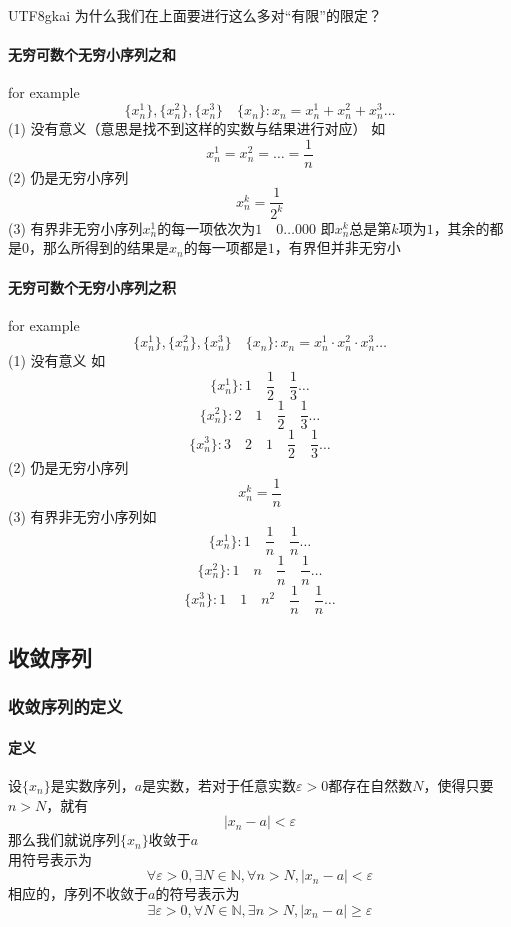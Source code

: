 \documentclass{article}
\begin{document}
\begin{CJK}{UTF8}{gkai}
为什么我们在上面要进行这么多对“有限”的限定？\\
\paragraph{无穷可数个无穷小序列之和}
for example\[\{x_n^1\},\{x_n^2\},\{x_n^3\}\quad \{x_n\}:x_n=x_n^1+x_n^2+x_n^3\dots\]
(1) 没有意义（意思是找不到这样的实数与结果进行对应） 如\[x_n^1=x_n^2=\dots=\frac{1}{n}\]
(2) 仍是无穷小序列\[x_n^k=\frac{1}{2^k}\]
(3) 有界非无穷小序列$x_n^1$的每一项依次为$1\quad 0 \dots 0 0 0$
即$x_n^k$总是第$k$项为$1$，其余的都是$0$，那么所得到的结果是$x_n$的每一项都是$1$，有界但并非无穷小

\paragraph{无穷可数个无穷小序列之积}
for example\[\{x_n^1\},\{x_n^2\},\{x_n^3\}\quad \{x_n\}:x_n=x_n^1·x_n^2·x_n^3\dots\]
(1) 没有意义 如\[\{x_n^1\}:1 \quad\frac{1}{2}\quad \frac{1}{3} \dots\]
\[\{x_n^2\}:2\quad1\quad \frac{1}{2}\quad \frac{1}{3}\dots \]
\[ \{x_n^3\}: 3 \quad2\quad 1\quad \frac{1}{2}\quad \frac{1}{3} \dots \]
(2) 仍是无穷小序列\[x_n^k=\frac{1}{n}\]
(3) 有界非无穷小序列如\[\{x_n^1\}:1 \quad \frac{1}{n}\quad \frac{1}{n} \dots\]
\[\{x_n^2\}:1 \quad n\quad \frac{1}{n}\quad \frac{1}{n}\dots \]
\[\{x_n^3\}:1 \quad 1\quad n^2 \quad \frac{1}{n}\quad \frac{1}{n} \dots \]

\subsection{收敛序列}
\subsubsection{收敛序列的定义}
\paragraph{定义\\}
设$\{x_n\}$是实数序列，$a$是实数，若对于任意实数$\varepsilon > 0$都存在自然数$N$，使得只要$n > N$，就有
\[|x_n-a|<\varepsilon\]
那么我们就说序列$\{x_n\}$收敛于$a$\\

用符号表示为
\[\forall \varepsilon>0,\exists N\in \mathbb{N},\forall n > N, | x_n -a |   <  \varepsilon \]
相应的，序列不收敛于$a$的符号表示为
\[\exists \varepsilon>0,\forall N\in \mathbb{N},\exists n > N, | x_n -a | \geq \varepsilon \]


\end{CJK}
\end{document}
